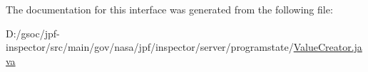 The documentation for this interface was generated from the following file\+:\begin{DoxyCompactItemize}
\item 
D\+:/gsoc/jpf-\/inspector/src/main/gov/nasa/jpf/inspector/server/programstate/\hyperlink{_value_creator_8java}{Value\+Creator.\+java}\end{DoxyCompactItemize}
